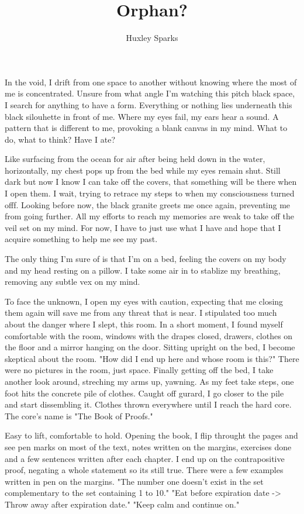 \title{Orphan?}
\author{Huxley Sparks}

		In the void, I drift from one space to another without knowing where the most of me is concentrated. Unsure from what angle I'm watching this pitch
	black space, I search for anything to have a form. Everything or nothing lies underneath this black silouhette in front of me. Where my eyes fail, my ears
	hear a sound. A pattern that is different to me, provoking a blank canvas in my mind. What to do, what to think? Have I ate?

		Like surfacing from the ocean for air after being held down in the water, horizontally, my chest pops up from the bed while my eyes remain shut. Still
	dark but now I know I can take off the covers, that something will be there when I open them. I wait, trying to retrace my steps to when my consciousness 
	turned offf. Looking before now, the black granite greets me once again, preventing me from going further. All my efforts to reach my memories are weak to
	take off the veil set on my mind. For now, I have to just use what I have and hope that I acquire something to help me see my past.
		
		The only thing I'm sure of is that I'm on a bed, feeling the covers on my body and my head resting on a pillow. I take some air in to stablize my 
	breathing, removing any subtle vex on my mind.	

		To face the unknown, I open my eyes with caution, expecting that me closing them again will save me from any threat that is near. I stipulated too much
	about the danger where I slept, this room. In a short moment, I found myself comfortable with the room, windows with the drapes closed, drawers, clothes on
	the floor and a mirror hanging on the door. Sitting upright on the bed, I become skeptical about the room. "How did I end up here and whose room is this?"
	There were no pictures in the room, just space. Finally getting off the bed, I take another look around, streching my arms up, yawning. As my feet take steps,
	one foot hits the concrete pile of clothes. Caught off gurard, I go closer to the pile and start dissembling it. Clothes thrown everywhere until I reach the
	hard core. The core's name is "The Book of Proofs."

		Easy to lift, comfortable to hold. Opening the book, I flip throught the pages and see pen marks on most of the text, notes written on the margins,
	exercises done and a few sentences written after each chapter. I end up on the contrapositive proof, negating a whole statement so its still true. There were
	a few examples written in pen on the margins. "The number one doesn't exist in the set complementary to the set containing 1 to 10." "Eat before expiration
	date -> Throw away after expiration date." "Keep calm and continue on."

